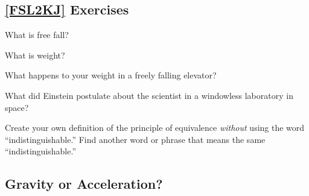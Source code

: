 \documentclass{article}
\numberwithin{equation}{section}
\numberwithin{figure}{section}
\begin{document}
\cyanhrule

\subsection*{\ref{FSL2KJ} Exercises}

\begin{exercise}
    What is free fall?
\end{exercise}

\begin{exercise}
    What is weight?
\end{exercise}

\begin{exercise}
    What happens to your weight in a freely falling elevator?
\end{exercise}

\begin{exercise}
    What did Einstein postulate about the scientist in a windowless laboratory in space?
\end{exercise}

\begin{exercise} \label{l6wd5D}
    Create your own definition of the principle of equivalence \textit{without} using the word ``indistinguishable.'' Find another word or phrase that means the same ``indistinguishable.''
\end{exercise}

\cyanhrule

\clearpage

\subsection*{Gravity or Acceleration?}
\end{document}
